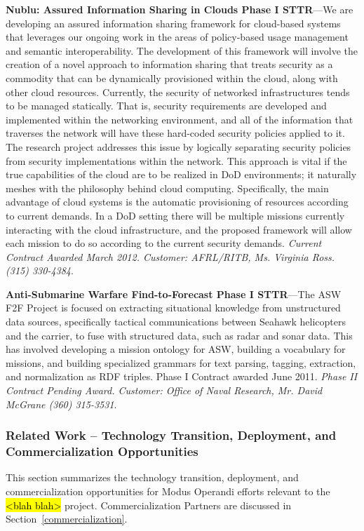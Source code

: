 \documentclass{sbir}
\begin{document}
{\bf Nublu: Assured Information Sharing in Clouds Phase I STTR}---We are developing an assured information sharing framework for cloud-based systems that leverages our ongoing work in the areas of policy-based usage management and semantic interoperability. The development of this framework will involve the creation of a novel approach to information sharing that treats security as a commodity that can be dynamically provisioned within the cloud, along with other cloud resources. Currently, the security of networked infrastructures tends to be managed statically. That is, security requirements are developed and implemented within the networking environment, and all of the information that traverses the network will have these hard-coded security policies applied to it. The research project addresses this issue by logically separating security policies from security implementations within the network. This approach is vital if the true capabilities of the cloud are to be realized in DoD environments; it naturally meshes with the philosophy behind cloud computing. Specifically, the main advantage of cloud systems is the automatic provisioning of resources according to current demands. In a DoD setting there will be multiple missions currently interacting with the cloud infrastructure, and the proposed framework will allow each mission to do so according to the current security demands. \emph{Current Contract Awarded March 2012. Customer: AFRL/RITB, Ms. Virginia Ross. (315) 330-4384}.

{\bf Anti-Submarine Warfare Find-to-Forecast Phase I STTR}---The ASW F2F Project is focused on extracting situational knowledge from unstructured data sources, specifically tactical communications between Seahawk helicopters and the carrier, to fuse with structured data, such as radar and sonar data. This has involved developing a mission ontology for ASW, building a vocabulary for missions, and building specialized grammars for text parsing, tagging, extraction, and normalization as RDF triples. Phase I Contract awarded June 2011. \emph{Phase II Contract Pending Award. Customer: Office of Naval Research, Mr. David McGrane (360) 315-3531}.

\subsubsection{Related Work -- Technology Transition, Deployment, and Commercialization Opportunities}
This section summarizes the technology transition, deployment, and commercialization opportunities for Modus Operandi efforts relevant to the \hl{<blah blah>} project. Commercialization Partners are discussed in Section~\ref{commercialization}.
\end{document}
